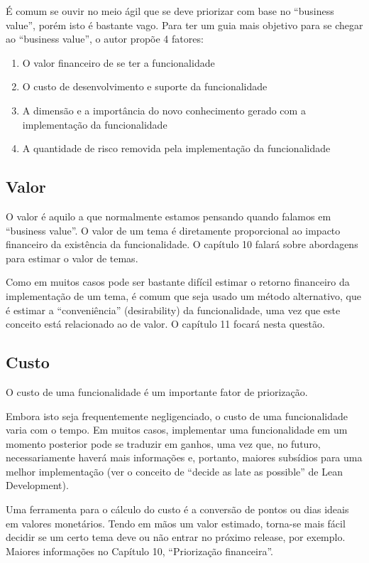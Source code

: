 \documentclass[a4paper,abntfigtabnum,noindentfirst]{abnt}
\begin{document}
É comum se ouvir no meio ágil que se deve priorizar com base no ``business value'', porém isto é bastante vago. Para ter um guia mais objetivo para se chegar ao ``business value'', o autor propõe 4 fatores:
\begin{enumerate}
\item O valor financeiro de se ter a funcionalidade
\item O custo de desenvolvimento e suporte da funcionalidade
\item A dimensão e a importância do novo conhecimento gerado com a implementação da funcionalidade
\item A quantidade de risco removida pela implementação da funcionalidade
\end{enumerate}

\subsection{Valor}

O valor é aquilo a que normalmente estamos pensando quando falamos em ``business value''. O valor de um tema é diretamente proporcional ao impacto financeiro da existência da funcionalidade. O capítulo 10 falará sobre abordagens para estimar o valor de temas.

Como em muitos casos pode ser bastante difícil estimar o retorno financeiro da implementação de um tema, é comum que seja usado um método alternativo, que é estimar a ``conveniência'' (desirability) da funcionalidade, uma vez que este conceito está relacionado ao de valor. O capítulo 11 focará nesta questão.

\subsection{Custo}

O custo de uma funcionalidade é um importante fator de priorização.

Embora isto seja frequentemente negligenciado, o custo de uma funcionalidade varia com o tempo. Em muitos casos, implementar uma funcionalidade em um momento posterior pode se traduzir em ganhos, uma vez que, no futuro, necessariamente haverá mais informações e, portanto, maiores subsídios para uma melhor implementação (ver o conceito de “decide as late as possible” de Lean Development).

Uma ferramenta para o cálculo do custo é a conversão de pontos ou dias ideais em valores monetários. Tendo em mãos um valor estimado, torna-se mais fácil decidir se um certo tema deve ou não entrar no próximo release, por exemplo. Maiores informações no Capítulo 10, ``Priorização financeira''.
\end{document}
